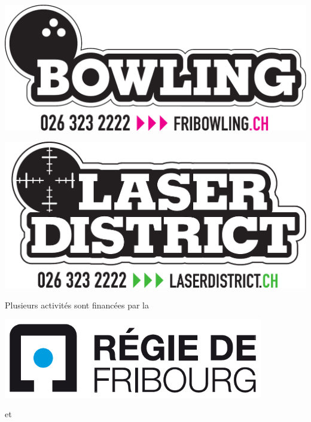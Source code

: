 \clearpage


\thispagestyle{empty}%
{\centering
\vspace*{15mm}
\includegraphics[width=.90\textwidth]{fig/bowling0.pdf}
\vspace*{25mm}

\includegraphics[width=.90\textwidth]{fig/bowling1.pdf}
\par
}

\clearpage

\begin{center}
{\Huge Plusieurs activités sont financées par la}
\vspace*{5mm}
\par
\includegraphics[width=0.85\textwidth]{fig/regie_fribourg.pdf}
\end{center}

\vfill
\begin{center}
	{\Huge et}
\end{center}
\vfill

